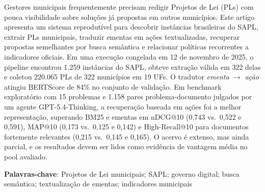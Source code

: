 \begin{resumo}
Gestores municipais frequentemente precisam redigir Projetos de Lei (PLs) com pouca visibilidade sobre soluções já propostas em outros municípios. Este artigo apresenta um sistema reprodutível para descobrir instâncias brasileiras do SAPL, extrair PLs municipais, traduzir ementas em ações textualizadas, recuperar propostas semelhantes por busca semântica e relacionar políticas recorrentes a indicadores oficiais. Em uma execução congelada em 12 de novembro de 2025, o pipeline encontrou 1.259 instâncias do SAPL, obteve extração válida em 322 delas e coletou 220.065 PLs de 322 municípios em 19 UFs. O tradutor \textit{ementa} $\rightarrow$ \textit{ação} atingiu BERTScore de 84\% no conjunto de validação. Em benchmark exploratório com 15 problemas e 1.158 pares problema-documento julgados por um agente GPT-5.4-Thinking, a recuperação baseada em ações foi a melhor representação, superando BM25 e ementas em nDCG@10 (0,743 vs.\ 0,522 e 0,591), MAP@10 (0,173 vs.\ 0,125 e 0,142) e High-Recall@10 para documentos fortemente relevantes (0,215 vs.\ 0,145 e 0,165). O acervo é extenso, mas ainda parcial, e os resultados devem ser lidos como evidência de vantagem média no pool avaliado.
\end{resumo}

\noindent\textbf{Palavras-chave}: Projetos de Lei municipais; SAPL; governo digital; busca semântica; textualização de ementas; indicadores municipais
